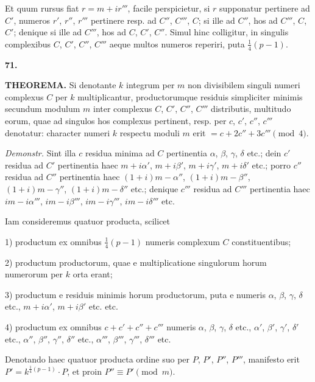 \documentclass[12pt,a4paper]{article}
\theoremstyle{plain}
\theoremstyle{definition}
\theoremstyle{remark}
\begin{document}
Et quum rursus fiat $r = m+ir'''$, facile perspicietur, si $r$ supponatur pertinere ad $C'$, numeros $r'$, $r''$, $r'''$ pertinere resp. ad $C''$, $C'''$, $C$; si ille ad $C''$, hos ad $C'''$, $C$, $C'$; denique si ille ad $C'''$, hos ad $C$, $C'$, $C''$. Simul hinc colligitur, in singulis complexibus $C$, $C'$, $C''$, $C'''$ aeque multos numeros reperiri, puta $\frac{1}{4}(p-1)$.

\bigskip

\noindent\textbf{71.}

\textbf{THEOREMA.} Si denotante $k$ integrum per $m$ non divisibilem singuli numeri complexus $C$ per $k$ multiplicantur, productorumque residuis simpliciter minimis secundum modulum $m$ inter complexus $C$, $C'$, $C''$, $C'''$ distributis, multitudo eorum, quae ad singulos hos complexus pertinent, resp. per $c$, $c'$, $c''$, $c'''$ denotatur: character numeri $k$ respectu moduli $m$ erit $= c + 2c'' + 3c''' \pmod{4}$.

\textit{Demonstr.} Sint illa $c$ residua minima ad $C$ pertinentia $\alpha$, $\beta$, $\gamma$, $\delta$ etc.; dein $c'$ residua ad $C'$ pertinentia haec $m+i\alpha'$, $m+i\beta'$, $m+i\gamma'$, $m+i\delta'$ etc.; porro $c''$ residua ad $C''$ pertinentia haec $(1+i)m-\alpha''$, $(1+i)m-\beta''$, $(1+i)m-\gamma''$, $(1+i)m-\delta''$ etc.; denique $c'''$ residua ad $C'''$ pertinentia haec $im-i\alpha'''$, $im-i\beta'''$, $im-i\gamma'''$, $im-i\delta'''$ etc.

Iam consideremus quatuor producta, scilicet

1) productum ex omnibus $\frac{1}{4}(p-1)$ numeris complexum $C$ constituentibus;

2) productum productorum, quae e multiplicatione singulorum horum numerorum per $k$ orta erant;

3) productum e residuis minimis horum productorum, puta e numeris $\alpha$, $\beta$, $\gamma$, $\delta$ etc., $m+i\alpha'$, $m+i\beta'$ etc. etc.

4) productum ex omnibus $c + c' + c'' + c'''$ numeris $\alpha$, $\beta$, $\gamma$, $\delta$ etc., $\alpha'$, $\beta'$, $\gamma'$, $\delta'$ etc., $\alpha''$, $\beta''$, $\gamma''$, $\delta''$ etc., $\alpha'''$, $\beta'''$, $\gamma'''$, $\delta'''$ etc.

Denotando haec quatuor producta ordine suo per $P$, $P'$, $P''$, $P'''$, manifesto erit $P' = k^{\frac{1}{4}(p-1)} \cdot P$, et proin $P'' \equiv P' \pmod{m}$.
\end{document}
